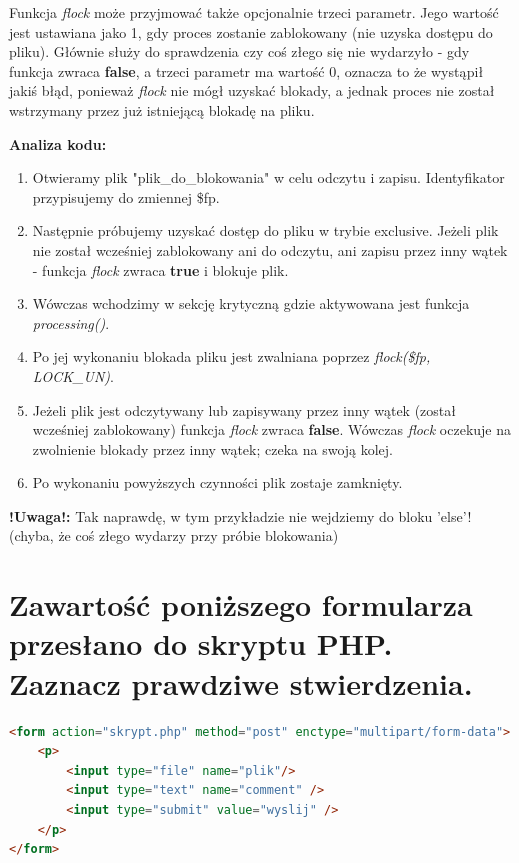 \begin{enumerate}
Funkcja \textit{flock} może przyjmować także opcjonalnie trzeci parametr. Jego wartość jest ustawiana jako 1, gdy proces zostanie zablokowany (nie uzyska dostępu do pliku). Głównie służy do sprawdzenia czy coś złego się nie wydarzyło - gdy funkcja zwraca \textbf{false}, a trzeci parametr ma wartość 0, oznacza to że wystąpił jakiś błąd, ponieważ \textit{flock} nie mógł uzyskać blokady, a jednak proces nie został wstrzymany przez już istniejącą blokadę na pliku.
\end{enumerate}


\textbf{Analiza kodu:}
\begin{enumerate}
\item
Otwieramy plik "plik\_do\_blokowania" w celu odczytu i zapisu. Identyfikator przypisujemy do zmiennej \$fp.
\item
Następnie próbujemy uzyskać dostęp do pliku w trybie exclusive.
Jeżeli plik nie został wcześniej zablokowany ani do odczytu, ani zapisu przez inny wątek - funkcja \textit{flock} zwraca \textbf{true} i blokuje plik.
\item
Wówczas wchodzimy w sekcję krytyczną gdzie aktywowana jest funkcja \textit{processing()}.
\item
Po jej wykonaniu blokada pliku jest zwalniana poprzez \textit{flock(\$fp, LOCK\_UN)}.
\item
Jeżeli plik jest odczytywany lub zapisywany przez inny wątek (został wcześniej zablokowany) funkcja \textit{flock} zwraca \textbf{false}.
Wówczas \textit{flock} oczekuje na zwolnienie blokady przez inny wątek; czeka na swoją kolej.
\item
Po wykonaniu powyższych czynności plik zostaje zamknięty.
\end{enumerate}

\noindent
\textbf{!Uwaga!: }Tak naprawdę, w tym przykładzie nie wejdziemy do bloku 'else'! (chyba, że coś złego wydarzy przy próbie blokowania)

\section{Zawartość poniższego formularza przesłano do skryptu PHP. Zaznacz prawdziwe stwierdzenia.}
\begin{lstlisting}[language=html, frame=single]
<form action="skrypt.php" method="post" enctype="multipart/form-data">
    <p>
        <input type="file" name="plik"/>
        <input type="text" name="comment" />
        <input type="submit" value="wyslij" />
    </p>
</form>
\end{lstlisting}

